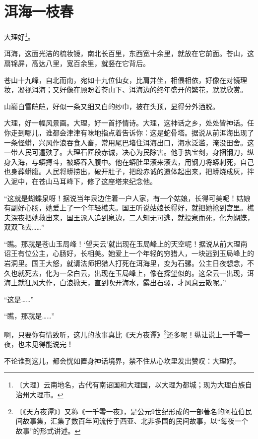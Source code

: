 \documentclass[12pt,UTF-8,openany]{ctexbook}
\begin{document}
\chapter{洱海一枝春}

\begin{large}
    
    大理好\footnote{〔大理〕云南地名，古代有南诏国和大理国，以大理为都城；现为大理白族自治州大理市。}。
    
    洱海，这面光洁的梳妆镜，南北长百里，东西宽十余里，就放在它前面。苍山，这扇锦屏，高达八里，宽百余里，就竖在它背后。
    
    苍山十九峰，自北而南，宛如十九位仙女，比肩并坐，相偎相依，好像在对镜理妆，凝视洱海；又好像在顾盼着苍山下、洱海边的终年盛开的繁花，默默欣赏。
    
    山巅白雪皑皑，好似一条又细又白的纱巾，披在头顶，显得分外洒脱。
    
    大理，好一幅风景画。大理，好一首抒情诗。大理，这神话之乡，处处皆神话。任你走到哪儿，谁都会津津有味地指点着告诉你：这是蛇骨塔。据说从前洱海出现了一条怪蟒，兴风作浪吞食人畜，常用尾巴堵住洱海出口，海水泛滥，淹没田舍。这一带人民可遭殃了。大理石匠段赤诚，决心为民除害。他手执宝剑，身捆钢刀，纵身入海，与蟒搏斗，被蟒吞入腹中。他在蟒肚里滚来滚去，用钢刀将蟒刺死，自己也身葬蟒腹。人民将蟒捞出，破开肚子，把段赤诚的遗体起出来，把蟒烧成灰，拌入泥中，在苍山马耳峰下，修了这座塔来纪念他。
    
    “这就是蝴蝶泉呀！据说当年泉边住着一户人家，有一个姑娘，长得可美呢！姑娘有副好心肠，她爱上了一个年轻樵夫。国王听说姑娘长得好，就把她抢到宫里。樵夫深夜把她救出来，国王派人追到泉边，二人知无可逃，就投泉而死，化为蝴蝶，双双飞去……”
    
    “瞧。那就是苍山玉局峰！‘望夫云’就出现在玉局峰上的天空呢！据说从前大理南诏王有位公主，心肠好，长相美。她爱上一个年轻的穷猎人，一块逃到玉局峰上的岩洞里。国王大怒，就请法师把猎人打死在洱海里，变为石骡。公主日夜想念，不久也就死去，化为一朵白云，出现在玉局峰上，像在探望似的。这朵云一出现，洱海上就狂风大作，白浪掀天，直到吹开海水，露出石骡，才风息云散呢。”
    
    “这是……”
    
    “瞧，那就是……”
    
    啊，只要你有情致听，这儿的故事真比《天方夜谭》\footnote{〔《天方夜谭》〕又称《一千零一夜》，是公元9世纪形成的一部著名的阿拉伯民间故事集，汇集了数百年间流传于西亚、北非多国的民间故事，以“每夜一个故事”的形式讲述。}还多呢！纵让说上一千零一夜，也未见得能说完！
    
    不论谁到这儿，都会恍如置身神话境界，禁不住从心坎里发出赞叹：大理好。
    

\end{large}
\end{document}
